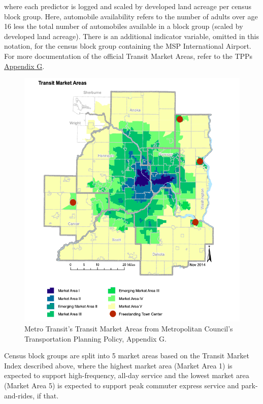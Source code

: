 \documentclass[
]{article}
\begin{document}
where each predictor is logged and scaled by developed land acreage per
census block group. Here, automobile availability refers to the number
of adults over age 16 less the total number of automobiles available in
a block group (scaled by developed land acreage). There is an additional
indicator variable, omitted in this notation, for the census block group
containing the MSP International Airport. For more documentation of the
official Transit Market Areas, refer to the TPPs
\href{https://metrocouncil.org/Transportation/Planning-2/Key-Transportation-Planning-Documents/Transportation-Policy-Plan/The-Adopted-2040-TPP-(1)/Final-2040-Transportation-Policy-Plan/2040-TPP-Appendix-G-Transit-Design-and-Perf-Standa.aspx}{Appendix
G}.

\begin{figure}[htb]
  \centering
  \includegraphics[width = 5in]{TMA.png}
  \caption{Metro Transit's Transit Market Areas from Metropolitan Council's Transportation Planning Policy, Appendix G. }
\end{figure}

Census block groups are split into 5 market areas based on the Transit
Market Index described above, where the highest market area (Market Area
1) is expected to support high-frequency, all-day service and the lowest
market area (Market Area 5) is expected to support peak commuter express
service and park-and-rides, if that.
\end{document}
